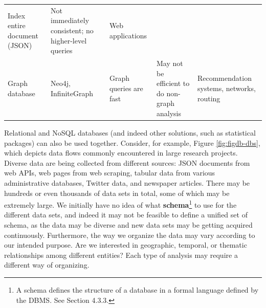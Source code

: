 \documentclass[]{krantz}
\begin{document}
\begin{longtable}[]{@{}lllll@{}}
\begin{minipage}[t]{0.22\columnwidth}
Index entire document (JSON)\strut
\end{minipage} & \begin{minipage}[t]{0.20\columnwidth}\raggedright\strut
Not immediately consistent; no higher-level queries\strut
\end{minipage} & \begin{minipage}[t]{0.21\columnwidth}\raggedright\strut
Web applications\strut
\end{minipage}\tabularnewline
\begin{minipage}[t]{0.07\columnwidth}\raggedright\strut
Graph database\strut
\end{minipage} & \begin{minipage}[t]{0.16\columnwidth}\raggedright\strut
Neo4j, InfiniteGraph\strut
\end{minipage} & \begin{minipage}[t]{0.22\columnwidth}\raggedright\strut
Graph queries are fast\strut
\end{minipage} & \begin{minipage}[t]{0.20\columnwidth}\raggedright\strut
May not be efficient to do non-graph analysis\strut
\end{minipage} & \begin{minipage}[t]{0.21\columnwidth}\raggedright\strut
Recommendation systems, networks, routing\strut
\end{minipage}\tabularnewline
\bottomrule
\end{longtable}

Relational and NoSQL databases (and indeed other solutions, such as
statistical packages) can also be used together. Consider, for example,
Figure \ref{fig:figdb-dbs}, which depicts data flows commonly
encountered in large research projects. Diverse data are being collected
from different sources: JSON documents from web APIs, web pages from web
scraping, tabular data from various administrative databases, Twitter
data, and newspaper articles. There may be hundreds or even thousands of
data sets in total, some of which may be extremely large. We initially
have no idea of what \textbf{schema}\footnote{A schema defines the
  structure of a database in a formal language defined by the DBMS. See
  Section 4.3.3.} to use for the different data sets, and indeed it may
not be feasible to define a unified set of schema, as the data may be
diverse and new data sets may be getting acquired continuously.
Furthermore, the way we organize the data may vary according to our
intended purpose. Are we interested in geographic, temporal, or thematic
relationships among different entities? Each type of analysis may
require a different way of organizing.
\end{document}
